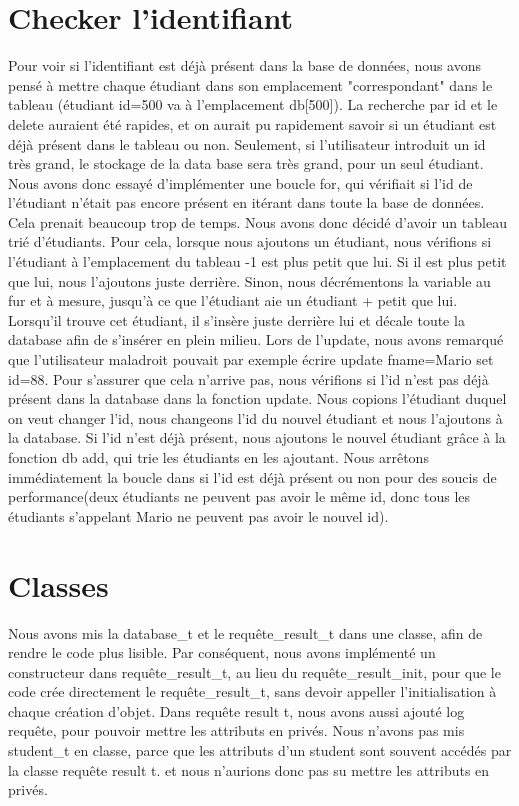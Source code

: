 \documentclass[utf8]{article}
\begin{document}
\section{Checker l'identifiant}
\indent{}
\par
Pour voir si l'identifiant est déjà présent dans la base de données, nous avons pensé à mettre chaque étudiant
dans son emplacement "correspondant" dans le tableau (étudiant id=500 va à l'emplacement db[500]). La recherche par id et le delete auraient été rapides, et on 
aurait pu rapidement savoir si un étudiant est déjà présent dans le tableau ou non.
Seulement, si l'utilisateur introduit un id très grand, le stockage de la data base sera très grand, pour un seul étudiant.
Nous avons donc essayé d'implémenter une boucle for, qui vérifiait si l'id de l'étudiant n'était pas encore présent en itérant dans toute la base de données.
Cela prenait beaucoup trop de temps. Nous avons donc décidé d'avoir un tableau trié d'étudiants. Pour cela, lorsque nous ajoutons un étudiant,
nous vérifions si l'étudiant à l'emplacement du tableau -1 est plus petit que lui. Si il est plus petit que lui, nous l'ajoutons juste derrière. Sinon, 
nous décrémentons la variable au fur et à mesure, jusqu'à ce que l'étudiant aie un étudiant + petit que lui. Lorsqu'il trouve cet étudiant, il s'insère juste derrière lui
et décale toute la database afin de s'insérer en plein milieu.
Lors de l'update, nous avons remarqué que l'utilisateur maladroit pouvait par exemple écrire update fname=Mario set id=88.
Pour s'assurer que cela n'arrive pas, nous vérifions si l'id n'est pas déjà présent dans la database dans la fonction update.
Nous copions l'étudiant duquel on veut changer l'id, nous changeons l'id du nouvel étudiant et nous l'ajoutons à la database. Si l'id 
n'est déjà présent, nous ajoutons le nouvel étudiant grâce à la fonction db add, qui trie les étudiants en les ajoutant.
Nous arrêtons immédiatement la boucle dans si l'id est déjà présent ou non pour des soucis de performance(deux étudiants ne peuvent pas avoir le même id, 
donc tous les étudiants s'appelant Mario ne peuvent pas avoir le nouvel id). 
\par




\section{Classes}
\indent{}
\par
Nous avons mis la database\_t et le requête\_result\_t dans une classe, afin de rendre le code plus lisible. Par conséquent,
nous avons implémenté un constructeur dans requête\_result\_t, au lieu du requête\_result\_init, pour que le code
crée directement le requête\_result\_t, sans devoir appeller l'initialisation à chaque création d'objet.
Dans requête result t, nous avons aussi ajouté log requête, pour pouvoir mettre les attributs en privés.
Nous n'avons pas mis student\_t en classe, parce que les attributs d'un student sont souvent accédés par la classe requête result t.
et nous n'aurions donc pas su mettre les attributs en privés.
\end{document}

